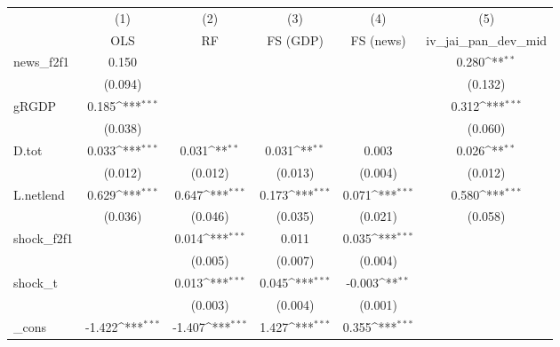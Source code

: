 {
\def\sym#1{\ifmmode^{#1}\else\(^{#1}\)\fi}
\begin{tabular}{l*{5}{c}}
\toprule
            &\multicolumn{1}{c}{(1)}&\multicolumn{1}{c}{(2)}&\multicolumn{1}{c}{(3)}&\multicolumn{1}{c}{(4)}&\multicolumn{1}{c}{(5)}\\
            &\multicolumn{1}{c}{OLS}&\multicolumn{1}{c}{RF}&\multicolumn{1}{c}{FS (GDP)}&\multicolumn{1}{c}{FS (news)}&\multicolumn{1}{c}{iv\_jai\_pan\_dev\_mid}\\
\midrule
news\_f2f1   &       0.150         &                     &                     &                     &       0.280\sym{**} \\
            &     (0.094)         &                     &                     &                     &     (0.132)         \\
\addlinespace
gRGDP       &       0.185\sym{***}&                     &                     &                     &       0.312\sym{***}\\
            &     (0.038)         &                     &                     &                     &     (0.060)         \\
\addlinespace
D.tot       &       0.033\sym{***}&       0.031\sym{**} &       0.031\sym{**} &       0.003         &       0.026\sym{**} \\
            &     (0.012)         &     (0.012)         &     (0.013)         &     (0.004)         &     (0.012)         \\
\addlinespace
L.netlend   &       0.629\sym{***}&       0.647\sym{***}&       0.173\sym{***}&       0.071\sym{***}&       0.580\sym{***}\\
            &     (0.036)         &     (0.046)         &     (0.035)         &     (0.021)         &     (0.058)         \\
\addlinespace
shock\_f2f1  &                     &       0.014\sym{***}&       0.011         &       0.035\sym{***}&                     \\
            &                     &     (0.005)         &     (0.007)         &     (0.004)         &                     \\
\addlinespace
shock\_t     &                     &       0.013\sym{***}&       0.045\sym{***}&      -0.003\sym{**} &                     \\
            &                     &     (0.003)         &     (0.004)         &     (0.001)         &                     \\
\addlinespace
\_cons      &      -1.422\sym{***}&      -1.407\sym{***}&       1.427\sym{***}&       0.355\sym{***}&                     \\

\end{tabular}}
